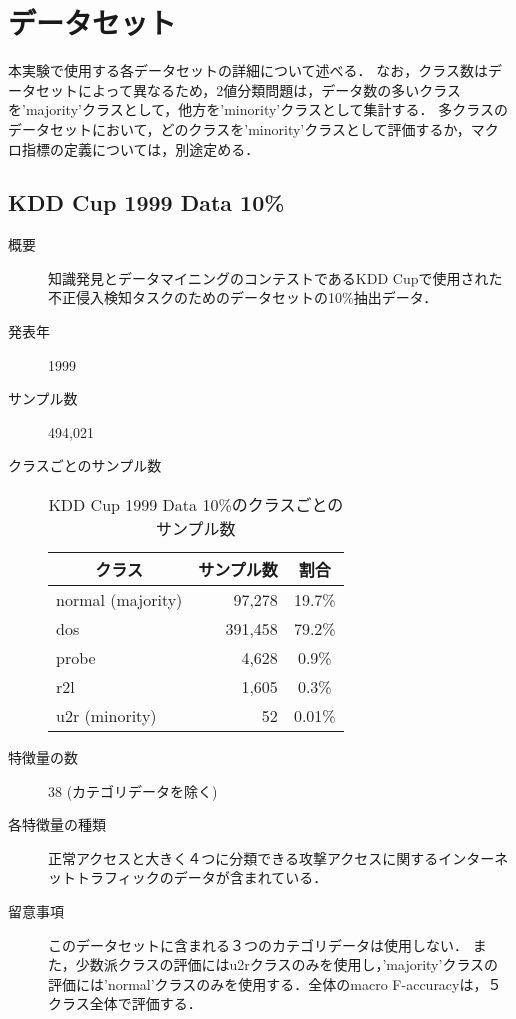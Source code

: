 \section{データセット}
\label{sec:dataset}
本実験で使用する各データセットの詳細について述べる．
なお，クラス数はデータセットによって異なるため，2値分類問題は，データ数の多いクラスを'majority'クラスとして，他方を'minority'クラスとして集計する．
多クラスのデータセットにおいて，どのクラスを'minority'クラスとして評価するか，マクロ指標の定義については，別途定める．

\subsection{KDD Cup 1999 Data 10\%}
\begin{description}
    \item[概要] 知識発見とデータマイニングのコンテストであるKDD Cupで使用された不正侵入検知タスクのためのデータセットの10\%抽出データ．
    \item[発表年] 1999
    \item[サンプル数] 494,021
    \item[クラスごとのサンプル数] \mbox{}
        \begin{table}[htbp]
            \centering
            \caption{KDD Cup 1999 Data 10\%のクラスごとのサンプル数}
                \label{tab:kddcup1999data10percent}
                \begin{tabular}{lrc} \hline
                    \multicolumn{1}{c}{クラス}&
                    \multicolumn{1}{c}{サンプル数}&
                    \multicolumn{1}{c}{割合}\\
                    \hline
                    \hline
                    normal  (majority)& 97,278 & 19.7\% \\
                    dos & 391,458 & 79.2\% \\
                    probe & 4,628 & 0.9\% \\
                    r2l & 1,605 & 0.3\% \\
                    u2r (minority)& 52 & 0.01\% \\ 
                    \hline
                \end{tabular}
        \end{table}
    \item[特徴量の数] 38 (カテゴリデータを除く)
    \item[各特徴量の種類] 正常アクセスと大きく４つに分類できる攻撃アクセスに関するインターネットトラフィックのデータが含まれている．
    \item[留意事項] このデータセットに含まれる３つのカテゴリデータは使用しない．
                   また，少数派クラスの評価にはu2rクラスのみを使用し，'majority'クラスの評価には'normal'クラスのみを使用する．全体のmacro F-accuracyは，５クラス全体で評価する．
\end{description}

